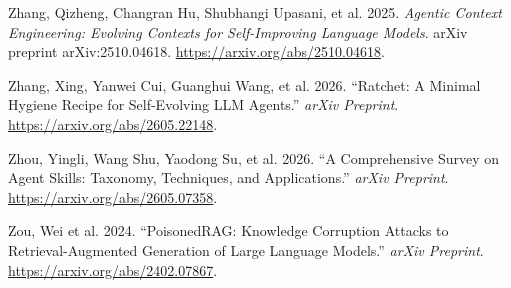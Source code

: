 \documentclass[
]{article}
\newlength{\cslhangindent}
\newenvironment{CSLReferences}[2] %
 {\begin{list}{}{%
  \setlength{\itemindent}{0pt}
  \setlength{\leftmargin}{0pt}
  \setlength{\parsep}{0pt}
  \ifodd #1
   \setlength{\leftmargin}{\cslhangindent}
   \setlength{\itemindent}{-1\cslhangindent}
  \fi
  \setlength{\itemsep}{#2\baselineskip}}}
 {\end{list}}
\begin{document}
\begin{CSLReferences}{1}{1}
{Zhang, Qizheng, Changran Hu, Shubhangi Upasani, et al.} 2025.
\emph{Agentic Context Engineering: Evolving Contexts for Self-Improving
Language Models}. arXiv preprint arXiv:2510.04618.
\url{https://arxiv.org/abs/2510.04618}.

Zhang, Xing, Yanwei Cui, Guanghui Wang, et al. 2026. {``{Ratchet}: A
Minimal Hygiene Recipe for Self-Evolving {LLM} Agents.''} \emph{arXiv
Preprint}. \url{https://arxiv.org/abs/2605.22148}.

{Zhou, Yingli, Wang Shu, Yaodong Su, et al.} 2026. {``A Comprehensive
Survey on Agent Skills: Taxonomy, Techniques, and Applications.''}
\emph{arXiv Preprint}. \url{https://arxiv.org/abs/2605.07358}.

{Zou, Wei et al.} 2024. {``{PoisonedRAG}: Knowledge Corruption Attacks
to Retrieval-Augmented Generation of Large Language Models.''}
\emph{arXiv Preprint}. \url{https://arxiv.org/abs/2402.07867}.

\end{CSLReferences}
\end{document}
